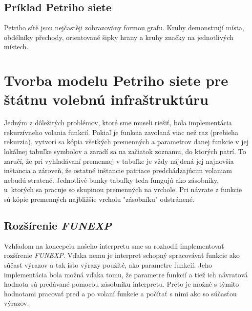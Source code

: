 \documentclass[12pt,a4paper,titlepage,final]{article}
\begin{document}
\subsection{Príklad Petriho siete}
Petriho sítě jsou nejčastěji zobrazovány formou grafu. Kruhy demonstrují místa, obdélníky přechody,
orientované šipky hrany a kruhy značky na jednotlivých místech.
\begin{figure}
\end{figure}



\section{Tvorba modelu Petriho siete pre štátnu volebnú infraštruktúru}
Jedným z dôležitých problémov, ktoré sme museli riešiť, bola implementácia rekurzívneho volania funkcií. Pokiaľ je funkcia zavolaná viac než raz (prebieha rekurzia), vytvorí sa kópia všetkých premenných a parametrov danej funkcie v jej lokálnej tabuľke symbolov a zaradí sa na začiatok zoznamu, do ktorých patrí. To zaručí, že pri vyhľadávaní premennej v tabuľke je vždy nájdená jej najnovšia inštancia a zároveň, že ostatné inštancie patriace predchádzajúcim volaniam nebudú stratené. Jednotlivé bunky tabuľky teda fungujú ako zásobníky, u~ktorých sa pracuje so skupinou premenných na vrchole. Pri návrate z funkcie sú kópie premenných najbližšie vrcholu "zásobníku" odstránené.

\subsection{Rozšírenie \emph{FUNEXP}}
Vzhľadom na koncepciu našeho interpretu sme sa rozhodli implementovať rozšírenie \emph{FUNEXP}. Vďaka nemu je interpret schopný spracovávať funkcie ako súčasť výrazov a tak isto výrazy použité, ako parametre funkcií. Jeho implementácia bola možná vďaka tomu, že parametre funkcií a tiež ich návratová hodnota sú predávané pomocou zásobníku interpretu. Preto je možné s týmito hodnotami pracovať pred a po volaní funkcie a počítať s nimi ako so súčasťou výrazov.
\end{document}
